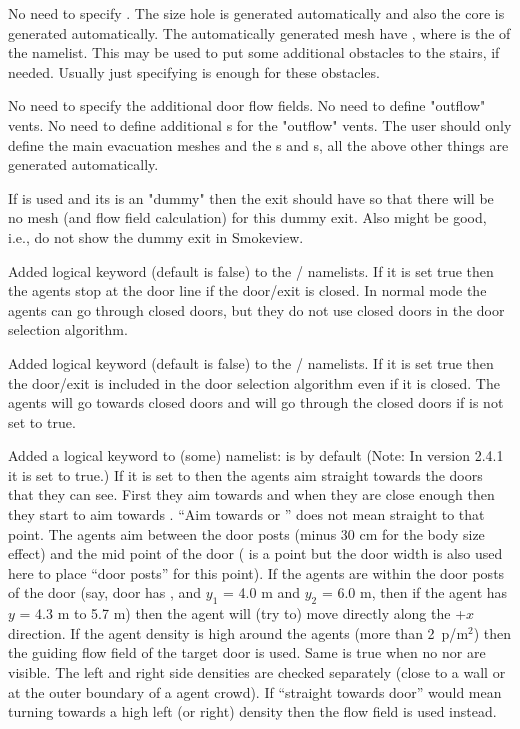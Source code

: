 \documentclass[12pt,a4paper,final,twoside]{stylevk}
\begin{document}
No need to specify .  The  size hole is
generated automatically and also the core  is generated
automatically.  The automatically generated mesh have
, where  is the 
of the  namelist.  This  may be used to put some
additional obstacles to the stairs, if needed.  Usually just
specifying  is enough for these obstacles.

No need to specify the additional door flow fields.  No need to define
"outflow" vents.  No need to define additional s for the "outflow"
vents.  The user should only define the main evacuation meshes and the
s and s, all the above other things are
generated automatically.

If  is used and its  is an "dummy"
 then the exit should have  so
that there will be no mesh (and flow field calculation) for this dummy
exit.  Also  might be good, i.e., do not show the
dummy exit in Smokeview.

Added logical keyword  (default is false)
to the / namelists.  If it is set true then
the agents stop at the door line if the door/exit is closed.  In
normal mode the agents can go through closed doors, but they do not
use closed doors in the door selection algorithm.

Added logical keyword  (default is false)
to the / namelists.  If it is set true then
the door/exit is included in the door selection algorithm even if it
is closed.  The agents will go towards closed doors and will go
through the closed doors if  is not set to
true.

Added a logical keyword to (some)  namelist:
 is by default   (Note: In version
2.4.1 it is set to true.)  If it is set to   then the
agents aim straight towards the doors that they can see.  First they
aim towards  and when they are close enough then they start
to aim towards .  ``Aim towards  or ''
does not mean straight to that point.  The agents aim between the door
posts (minus 30 cm for the body size effect) and the mid point of the
door ( is a point but the door width is also used here to
place ``door posts'' for this point).  If the agents are within the door
posts of the door (say, door has , and $y_1$ = 4.0 m and
$y_2$ = 6.0 m, then if the agent has $y$ = 4.3 m to 5.7 m) then the
agent will (try to) move directly along the +$x$ direction.  If the
agent density is high around the agents (more than 2~p/$\textrm{m}^2$)
then the guiding flow field of the target door is used.  Same is true
when no  nor  are visible.  The left and right
side densities are checked separately (close to a wall or at the outer
boundary of a agent crowd).  If ``straight towards door'' would mean
turning towards a high left (or right) density then the flow field is
used instead.
\end{document}
